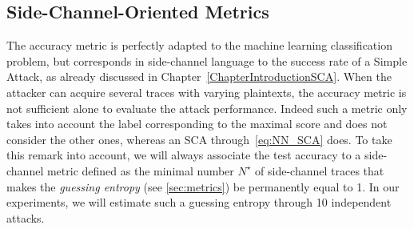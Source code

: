 \subsection{Side-Channel-Oriented Metrics} The accuracy metric is perfectly adapted to the machine learning classification problem, but corresponds in side-channel language to the success rate of a Simple Attack, as already discussed in Chapter~\ref{ChapterIntroductionSCA}. When the attacker can acquire several traces with varying plaintexts, the accuracy metric is not sufficient alone to evaluate the attack performance.
Indeed such a metric only takes into account the label corresponding to the maximal score and does not consider the other ones, whereas an SCA through~\eqref{eq:NN_SCA} does. To take this remark into account, we will always associate the test accuracy to a side-channel metric defined as the minimal number  $N^\star$ of side-channel traces that makes the \emph{guessing entropy} (see \ref{sec:metrics}) be permanently equal to 1. In our experiments, we will estimate such a guessing entropy through 10 independent attacks. \\
%
%




